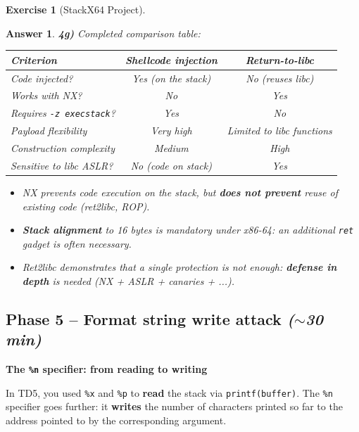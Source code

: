 \documentclass[a4paper,11pt]{article}
\theoremstyle{plain}
\newtheorem{correction}{Answer}
\theoremstyle{definition}
\newtheorem{exercice}{Exercise}
\begin{document}
\begin{exercice}[StackX64 Project]
\begin{correction}
\textbf{4g)} Completed comparison table:
\begin{center}
\begin{tabular}{lcc}
\toprule
\textbf{Criterion} & \textbf{Shellcode injection} & \textbf{Return-to-libc} \\
\midrule
Code injected? & Yes (on the stack) & No (reuses libc) \\
Works with NX? & No & Yes \\
Requires \texttt{-z execstack}? & Yes & No \\
Payload flexibility & Very high & Limited to libc functions \\
Construction complexity & Medium & High \\
Sensitive to libc ASLR? & No (code on stack) & Yes \\
\bottomrule
\end{tabular}
\end{center}

\begin{pointcle}
\begin{itemize}
    \item NX prevents code execution on the stack, but \textbf{does not prevent} reuse of existing code (ret2libc, ROP).
    \item \textbf{Stack alignment} to 16 bytes is mandatory under x86-64: an additional \texttt{ret} gadget is often necessary.
    \item Ret2libc demonstrates that a single protection is not enough: \textbf{defense in depth} is needed (NX + ASLR + canaries + ...).
\end{itemize}
\end{pointcle}

\end{correction}



\subsection*{Phase 5 -- Format string write attack \hfill\normalfont\textit{($\sim$30 min)}}

\begin{rappel}
\textbf{The \texttt{\%n} specifier: from reading to writing}

In TD5, you used \texttt{\%x} and \texttt{\%p} to \textbf{read} the stack via \texttt{printf(buffer)}. The \texttt{\%n} specifier goes further: it \textbf{writes} the number of characters printed so far to the address pointed to by the corresponding argument.


\end{rappel}
\end{exercice}
\end{document}
